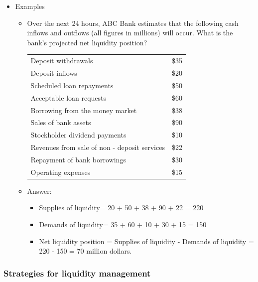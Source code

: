 \begin{itemize}
\begin{itemize}
    \end{itemize}
\item Examples
    \begin{itemize}
    \item Over the next 24 hours, ABC Bank estimates that the following cash inflows and outflows (all figures in millions) will occur. What is the bank's projected net liquidity position?
    
    \begin{tabular}{@{}lc@{}}
        \toprule
        Deposit withdrawals & \$35 \\
        Deposit inflows & \$20 \\
        Scheduled loan repayments & \$50 \\
        Acceptable loan requests & \$60 \\
        Borrowing from the money market & \$38 \\
        Sales of bank assets & \$90 \\
        Stockholder dividend payments & \$10 \\
        Revenues from sale of non - deposit services & \$22 \\
        Repayment of bank borrowings & \$30 \\
        Operating expenses & \$15 \\
        \bottomrule
        \end{tabular}
    \item Answer:
        \begin{itemize}
        \item Supplies of liquidity= 20 + 50 + 38 + 90 + 22 = 220
        \item Demands of liquidity= 35 + 60 + 10 + 30 + 15 = 150
        \item Net liquidity position = Supplies of liquidity - Demands of liquidity = 220 - 150 = 70 million dollars.
        \end{itemize}
    \end{itemize}
\end{itemize}




\subsubsection{Strategies for liquidity management}


